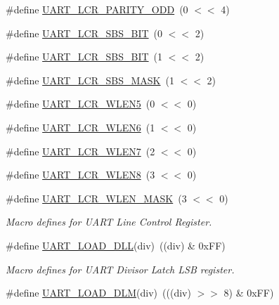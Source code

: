 \begin{DoxyCompactItemize}
\item 
\#define \hyperlink{group__UART__17XX__40XX_ga5ef9bdb85d3f5c3823d667190b19bb40}{U\+A\+R\+T\+\_\+\+L\+C\+R\+\_\+\+P\+A\+R\+I\+T\+Y\+\_\+\+O\+DD}~(0 $<$$<$ 4)
\item 
\#define \hyperlink{group__UART__17XX__40XX_ga70ccdedb76a079b8e7c87e5c3709469c}{U\+A\+R\+T\+\_\+\+L\+C\+R\+\_\+\+S\+B\+S\+\_\+B\+IT}~(0 $<$$<$ 2)
\item 
\#define \hyperlink{group__UART__17XX__40XX_ga6d36ad770b49b2354ed5cefbc066b7e2}{U\+A\+R\+T\+\_\+\+L\+C\+R\+\_\+\+S\+B\+S\+\_\+B\+IT}~(1 $<$$<$ 2)
\item 
\#define \hyperlink{group__UART__17XX__40XX_ga99a703d7a010edb3c940b54537ccdb08}{U\+A\+R\+T\+\_\+\+L\+C\+R\+\_\+\+S\+B\+S\+\_\+\+M\+A\+SK}~(1 $<$$<$ 2)
\item 
\#define \hyperlink{group__UART__17XX__40XX_ga2c64fd92092b8ac1e64b6b1204927682}{U\+A\+R\+T\+\_\+\+L\+C\+R\+\_\+\+W\+L\+E\+N5}~(0 $<$$<$ 0)
\item 
\#define \hyperlink{group__UART__17XX__40XX_ga916fcefe6db8651be1cb1c066726381d}{U\+A\+R\+T\+\_\+\+L\+C\+R\+\_\+\+W\+L\+E\+N6}~(1 $<$$<$ 0)
\item 
\#define \hyperlink{group__UART__17XX__40XX_ga7746eb5a2aac4b9f86e97ee82e5e2a10}{U\+A\+R\+T\+\_\+\+L\+C\+R\+\_\+\+W\+L\+E\+N7}~(2 $<$$<$ 0)
\item 
\#define \hyperlink{group__UART__17XX__40XX_ga71ecde192fb0c9facb9ef9c6b77cc687}{U\+A\+R\+T\+\_\+\+L\+C\+R\+\_\+\+W\+L\+E\+N8}~(3 $<$$<$ 0)
\item 
\#define \hyperlink{group__UART__17XX__40XX_ga0d00b51fd6ca0b80b89af4044d94bbc0}{U\+A\+R\+T\+\_\+\+L\+C\+R\+\_\+\+W\+L\+E\+N\+\_\+\+M\+A\+SK}~(3 $<$$<$ 0)
\begin{DoxyCompactList}\small\item\em Macro defines for U\+A\+RT Line Control Register. \end{DoxyCompactList}\item 
\#define \hyperlink{group__UART__17XX__40XX_ga55a89461d99a43769772276e51a6710a}{U\+A\+R\+T\+\_\+\+L\+O\+A\+D\+\_\+\+D\+LL}(div)~((div) \& 0x\+F\+F)
\begin{DoxyCompactList}\small\item\em Macro defines for U\+A\+RT Divisor Latch L\+SB register. \end{DoxyCompactList}\item 
\#define \hyperlink{group__UART__17XX__40XX_gac53f4cc36f13edd3fdf7fd9bab1360e2}{U\+A\+R\+T\+\_\+\+L\+O\+A\+D\+\_\+\+D\+LM}(div)~(((div) $>$$>$ 8) \& 0x\+F\+F)

\end{DoxyCompactItemize}
